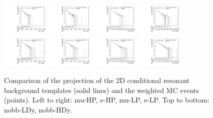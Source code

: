 \begin{figure}[htbp]
  \centering
  \includegraphics[width=0.2\textwidth]{fig/2Dfit/templateVsReco_res_r0_MVV_mu_HP_nobb_LDy.pdf}
  \includegraphics[width=0.2\textwidth]{fig/2Dfit/templateVsReco_res_r0_MVV_e_HP_nobb_LDy.pdf}
  \includegraphics[width=0.2\textwidth]{fig/2Dfit/templateVsReco_res_r0_MVV_mu_LP_nobb_LDy.pdf}
  \includegraphics[width=0.2\textwidth]{fig/2Dfit/templateVsReco_res_r0_MVV_e_LP_nobb_LDy.pdf}\\
  \includegraphics[width=0.2\textwidth]{fig/2Dfit/templateVsReco_res_r0_MVV_mu_HP_nobb_HDy.pdf}
  \includegraphics[width=0.2\textwidth]{fig/2Dfit/templateVsReco_res_r0_MVV_e_HP_nobb_HDy.pdf}
  \includegraphics[width=0.2\textwidth]{fig/2Dfit/templateVsReco_res_r0_MVV_mu_LP_nobb_HDy.pdf}
  \includegraphics[width=0.2\textwidth]{fig/2Dfit/templateVsReco_res_r0_MVV_e_LP_nobb_HDy.pdf}\\
  \caption{
    Comparison of the \MVV projection of the 2D conditional resonant background templates (solid lines) and the weighted MC events (points).
    Left to right: mu-HP, e-HP, mu-LP, e-LP.
    Top to bottom: nobb-LDy, nobb-HDy.
  }
  \label{fig:condTemplateVscondReco_res_MVV_Run2}
\end{figure}

